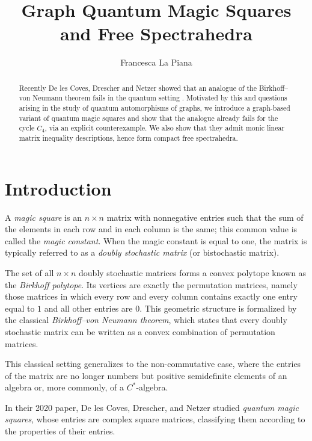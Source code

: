 \documentclass[11pt, a4paper]{article}
\title{Graph Quantum Magic Squares and Free Spectrahedra}
\author{Francesca La Piana\inst{1}}
\date{
\parbox[t]{0.9\textwidth}{\footnotesize{%
\begin{itemize}
\item[1] Department of Mathematics, University of Oslo, P.O.\ Box 1053, 0316 Blindern, Oslo (Norway), e-mail: franla@math.uio.no
\end{itemize}
}}
\\
\vspace{\baselineskip}
\today}
\theoremstyle{plain}
\theoremstyle{definition}
\theoremstyle{remark}
\begin{document}
\maketitle


\begin{abstract}


Recently De les Coves, Drescher and Netzer showed that an analogue of the Birkhoff--von Neumann theorem fails in the quantum setting \cite{DDN20}. Motivated by this and 
questions arising in the study of quantum automorphisms of graphs, we
introduce a graph-based variant of quantum magic squares and show that the
analogue already fails for the cycle \(C_4\), via an explicit
counterexample. We also show that they admit monic linear matrix inequality descriptions, hence form compact
free spectrahedra.
\end{abstract}


{
\hypersetup{linkcolor=Raspberry}
\tableofcontents
}

\tableofcontents

\section{Introduction}


A \emph{magic square} is an \(n \times n\) matrix with nonnegative entries such that the sum of the elements in each row and in each column is the same; this common value is called the \emph{magic constant}. 
When the magic constant is equal to one, the matrix is typically referred to as a \emph{doubly stochastic matrix} (or bistochastic matrix).

The set of all \(n \times n\) doubly stochastic matrices forms a convex polytope known as the \emph{Birkhoff polytope}. 
Its vertices are exactly the permutation matrices, namely those matrices in which every row and every column contains exactly one entry equal to \(1\) and all other entries are \(0\).
This geometric structure is formalized by the classical \emph{Birkhoff--von Neumann theorem}, which states that every doubly stochastic matrix can be written as a convex combination of permutation matrices.



This classical setting generalizes to the non-commutative case, where the entries of the matrix are no longer numbers but positive semidefinite elements of an algebra or, more commonly, of a \(C^*\)-algebra.

\medskip

In their 2020 paper, De les Coves, Drescher, and Netzer studied \emph{quantum magic squares}, whose entries are complex square matrices, classifying them according to the properties of their entries.
\end{document}
